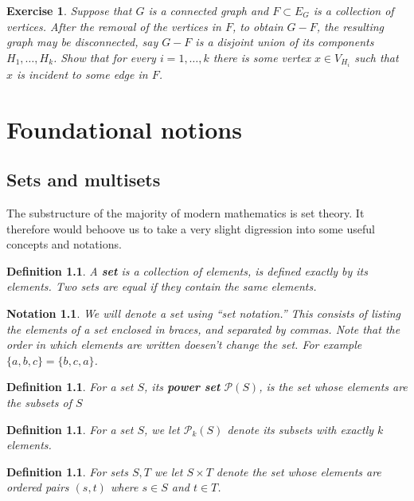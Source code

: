 \documentclass[12pt]{report}
\theoremstyle{plain}
\newtheorem{defn}[thm]{Definition}
\newtheorem{notn}[thm]{Notation}
\newtheorem{exercise}{Exercise}[section]
\newcommand{\ms}[1]{\mathscr #1}
\newcommand{\Xb}[1]{\textbf{#1}\index{#1}}
\begin{document}
\begin{exercise} \label{ex: disconnect touching}
Suppose that $G$ is a connected graph and $F \subset E_G$ is a collection of
vertices. After the removal of the vertices in $F$, to obtain $G - F$, the
resulting graph may be disconnected, say $G - F$ is a disjoint union of its
components $H_1, \ldots, H_k$. Show that for every $i = 1, \ldots, k$ there
is some vertex $x \in V_{H_i}$ such that $x$ is incident to some edge in
$F$.
\end{exercise}

\appendix

\chapter{Foundational notions}

\section{Sets and multisets}

The substructure of the majority of modern mathematics is set theory. It
therefore would behoove us to take a very slight digression into some
useful concepts and notations.

\begin{defn}
A \Xb{set} is a collection of elements, is defined exactly by its elements.
Two sets are equal if they contain the same elements.
\end{defn}

\begin{notn}
We will denote a set using ``set notation.'' This consists of listing the
elements of a set enclosed in braces, and separated by commas. Note that
the order in which elements are written doesen't change the set. For
example $\{a, b, c\} = \{b, c, a\}$.
\end{notn}

\begin{defn}
For a set $S$, its \Xb{power set} $\ms P(S)$, is the set whose
elements are the subsets of $S$
\end{defn}

\begin{defn}
For a set $S$, we let $\ms P_k(S)$ denote its subsets with exactly $k$
elements.
\end{defn}

\begin{defn}
For sets $S, T$ we let $S \times T$ denote the set whose elements are
ordered pairs $(s, t)$ where $s \in S$ and $t \in T$.
\end{defn}
\end{document}
